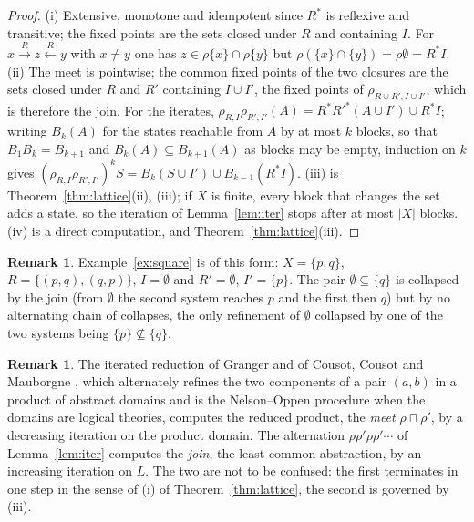 \documentclass[11pt]{amsart}
\theoremstyle{definition}
\newtheorem{rem}[thm]{Remark}
\begin{document}
\begin{proof}
(i) Extensive, monotone and idempotent since $R^*$ is reflexive and
transitive; the fixed points are the sets closed under $R$ and containing
$I$. For $x\xrightarrow{R}z\xleftarrow{R}y$ with $x\ne y$ one has
$z\in\rho\{x\}\cap\rho\{y\}$ but $\rho(\{x\}\cap\{y\})=\rho\emptyset=R^*I$.
(ii) The meet is pointwise; the common fixed points of the two closures
are the sets closed under $R$ and $R'$ containing $I\cup I'$, the fixed
points of $\rho_{R\cup R',I\cup I'}$, which is therefore the join. For the
iterates, $\rho_{R,I}\rho_{R',I'}(A)=R^*R'^*(A\cup I')\cup R^*I$; writing
$B_k(A)$ for the states reachable from $A$ by at most $k$ blocks, so that
$B_1B_k=B_{k+1}$ and $B_k(A)\subseteq B_{k+1}(A)$ as blocks may be empty,
induction on $k$ gives $(\rho_{R,I}\rho_{R',I'})^kS=B_k(S\cup I')\cup
B_{k-1}(R^*I)$. (iii) is Theorem~\ref{thm:lattice}(ii),
(iii); if $X$ is finite, every block that changes the set adds a state,
so the iteration of Lemma~\ref{lem:iter} stops after at most $|X|$ blocks.
(iv) is a direct computation, and Theorem~\ref{thm:lattice}(iii).
\end{proof}

\begin{rem}
Example~\ref{ex:square} is of this form: $X=\{p,q\}$, $R=\{(p,q),(q,p)\}$,
$I=\emptyset$ and $R'=\emptyset$, $I'=\{p\}$. The pair
$\emptyset\subseteq\{q\}$ is collapsed by the join (from $\emptyset$ the
second system reaches $p$ and the first then $q$) but by no alternating
chain of collapses, the only refinement of $\emptyset$ collapsed by one of
the two systems being $\{p\}\not\subseteq\{q\}$.
\end{rem}

\begin{rem}\label{rem:granger}
The iterated reduction of Granger \cite{Granger} and of Cousot, Cousot and
Mauborgne \cite{CCM11}, which alternately refines the two components of a
pair $(a,b)$ in a product of abstract domains and is the Nelson--Oppen
procedure when the domains are logical theories, computes the reduced
product, the \emph{meet} $\rho\sqcap\rho'$, by a decreasing iteration on
the product domain. The alternation $\rho\rho'\rho\rho'\cdots$ of
Lemma~\ref{lem:iter} computes the \emph{join}, the least common
abstraction, by an increasing iteration on $L$. The two are not to be
confused: the first terminates in one step in the sense of (i) of
Theorem~\ref{thm:lattice}, the second is governed by (iii).
\end{rem}
\end{document}

